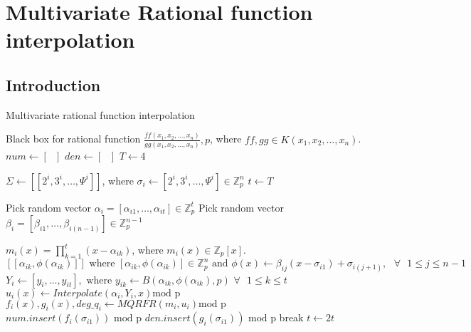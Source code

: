 \chapter{Multivariate Rational function interpolation}
\section{Introduction}


\begin{algorithm}
    \caption{Multivariate rational function interpolation}
    \begin{algorithmic}[1]
      \Require Black box for rational function $\frac{ff(x_{1}, x_2, \dots, x_n)}{gg(x_1, x_2, \dots, x_n)}, p$, where $ff,gg \in K(x_1, x_2, \dots, x_n)$.
      \State $num \gets [ \text{  }]$
      \State $den \gets [\text{  }  ]$
      \State $T \gets 4$\
      
      \State $\Sigma \gets [[2^i,3^i,\dots, \Psi^{i}]]$, where $\sigma_{i} \gets [2^i,3^i,\dots, \Psi^{i}] \in \mathbb{Z}^{n}_{p}$
      \State $t \gets T$

      \State Pick random vector $\alpha_{i} =[\alpha_{i1},\dots,\alpha_{it}] \in \mathbb{Z}^{t}_{p}$
      \State Pick random vector $\beta_{i}=[\beta_{i1},\dots,\beta_{i(n-1)}] \in \mathbb{Z}^{n-1}_{p}$
     
      \State $m_{i}(x)=\prod_{k=1}^{t} (x-\alpha_{ik})$, where $m_{i}(x) \in \mathbb{Z}_{p}[x]$.
    \State $[[\alpha_{ik},\phi(\alpha_{ik})]] \text{ where }  [\alpha_{ik},\phi(\alpha_{ik})]\in \mathbb{Z}^{n}_{p} 
     \text{ and }\phi(x) \gets \beta_{ij}(x-\sigma_{i1})+\sigma_{i(j+1)}, \text{ } \forall \text{ }1 \leq j \leq n-1$  
      \State $Y_{i} \gets [y_{i},\dots,y_{it}], \text{ where }y_{ik} \gets B(\alpha_{ik},\phi(\alpha_{ik}),p)$ $\forall \text{ }1\leq k \leq t$
      \State $u_{i}(x) \gets Interpolate(\alpha_{i},Y_{i},x ) \text{mod p}$
      \State $f_{i}(x),g_{i}(x),deg\_q_{i} \gets MQRFR(m_{i},u_{i}) \text{mod p}$
      \State  $num.insert(f_{i}(\sigma_{i1})) \text{ mod p}$
      \State  $den.insert(g_{i}(\sigma_{i1})) \text{ mod p} $
      \State break
      \Else 
        \State $t \gets 2t$
        \EndIf 
      \EndWhile


\end{algorithmic}
\end{algorithm}
